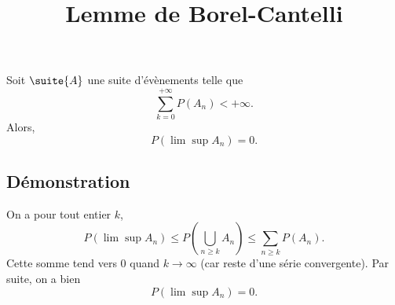 \documentclass[fontsize=12pt,twoside=false,parskip=half, french]{scrartcl}
\title{Lemme de Borel-Cantelli}
\date{}
\author{}
\begin{document}
\maketitle
   \begin{Theoreme}
      Soit $\suite{A}$ une suite d’évènements telle que
      \[
         \sum_{k = 0}^{+\infty}P(A_n) < + \infty.
      \]
      Alors,
      \[
         P\left(\lim \sup A_n\right) = 0.
      \]
   \end{Theoreme}
   \subsection{Démonstration}
      On a pour tout entier $k$,
      \[
         P\left(\lim \sup A_n\right) \leq P\left(\bigcup_{n \geq k} A_n\right) \leq \sum_{n \geq k} P(A_n). 
      \]
      Cette somme tend vers $0$ quand $k \to \infty$ (car reste d’une série convergente). Par suite, on a bien
      \[
          P(\lim \sup A_n) = 0.
      \]
\end{document}
